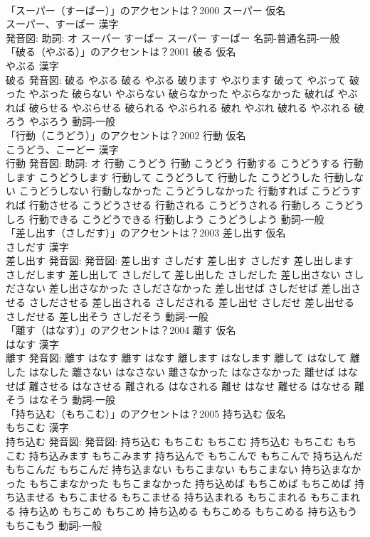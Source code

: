 \documentclass[8pt]{extreport}
\begin{document}
\begin{CJK}{UTF8}{min}
\\	「スーパー（すーぱー）」のアクセントは？2000	スーパー 仮名　
\\	スーパー、すーぱー 漢字　
\\	発音図: 助詞: オ	スーパー すーぱー		スーパー すーぱー				名詞-普通名詞-一般 
\\	「破る（やぶる）」のアクセントは？2001	破る 仮名　
\\	やぶる 漢字　
\\	破る 発音図:	破る やぶる		破る やぶる 破ります やぶります 破って やぶって 破った やぶった 破らない やぶらない 破らなかった やぶらなかった 破れば やぶれば 破らせる やぶらせる 破られる やぶられる 破れ やぶれ 破れる やぶれる 破ろう やぶろう				動詞-一般 
\\	「行動（こうどう）」のアクセントは？2002	行動 仮名　
\\	こうどう、こーどー 漢字　
\\	行動 発音図: 助詞: オ	行動 こうどう		行動 こうどう 行動する こうどうする 行動します こうどうします 行動して こうどうして 行動した こうどうした 行動しない こうどうしない 行動しなかった こうどうしなかった 行動すれば こうどうすれば 行動させる こうどうさせる 行動される こうどうされる 行動しろ こうどうしろ 行動できる こうどうできる 行動しよう こうどうしよう				動詞-一般 
\\	「差し出す（さしだす）」のアクセントは？2003	差し出す 仮名　
\\	さしだす 漢字　
\\	差し出す 発音図: 発音図:	差し出す さしだす		差し出す さしだす 差し出します さしだします 差し出して さしだして 差し出した さしだした 差し出さない さしださない 差し出さなかった さしださなかった 差し出せば さしだせば 差し出させる さしださせる 差し出される さしだされる 差し出せ さしだせ 差し出せる さしだせる 差し出そう さしだそう				動詞-一般 
\\	「離す（はなす）」のアクセントは？2004	離す 仮名　
\\	はなす 漢字　
\\	離す 発音図:	離す はなす		離す はなす 離します はなします 離して はなして 離した はなした 離さない はなさない 離さなかった はなさなかった 離せば はなせば 離させる はなさせる 離される はなされる 離せ はなせ 離せる はなせる 離そう はなそう				動詞-一般 
\\	「持ち込む（もちこむ）」のアクセントは？2005	持ち込む 仮名　
\\	もちこむ 漢字　
\\	持ち込む 発音図: 発音図:	持ち込む もちこむ もちこむ		持ち込む もちこむ もちこむ 持ち込みます もちこみます 持ち込んで もちこんで もちこんで 持ち込んだ もちこんだ もちこんだ 持ち込まない もちこまない もちこまない 持ち込まなかった もちこまなかった もちこまなかった 持ち込めば もちこめば もちこめば 持ち込ませる もちこませる もちこませる 持ち込まれる もちこまれる もちこまれる 持ち込め もちこめ もちこめ 持ち込める もちこめる もちこめる 持ち込もう もちこもう				動詞-一般 

\end{CJK}
\end{document}

